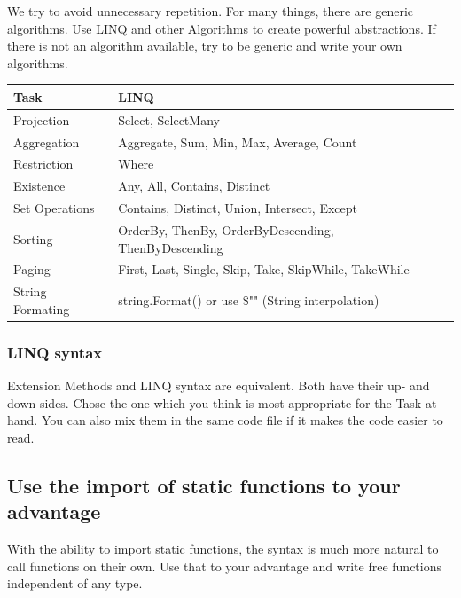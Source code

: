 \documentclass[11pt,a4paper]{article}
\begin{document}
We try to avoid unnecessary repetition. For many things, there are generic algorithms. Use LINQ and other Algorithms to create powerful abstractions.
If there is not an algorithm available, try to be generic and write your own algorithms.

\begin{table}
\centering
\begin{tabular}{lp{60mm}l}
\textbf{Task}        & \textbf{LINQ}                                         \\
\hline
Projection           & Select, SelectMany                                    \\
\hline
Aggregation          & Aggregate, Sum, Min, Max, Average, Count              \\
\hline
Restriction          & Where                                                 \\
\hline
Existence            & Any, All, Contains, Distinct                          \\
\hline
Set Operations       & Contains, Distinct, Union, Intersect, Except          \\
\hline
Sorting              & OrderBy, ThenBy, OrderByDescending, ThenByDescending  \\
\hline
Paging               & First, Last, Single, Skip, Take, SkipWhile, TakeWhile \\
\hline
String Formating     & string.Format() or use \$"" (String interpolation)
\end{tabular}
\end{table}

\subsubsection{LINQ syntax}

Extension Methods and LINQ syntax are equivalent. Both have their up- and down-sides. Chose the one which you think is most appropriate for the Task at hand. You can also mix them in the same code file if it makes the code easier to read.

\subsection{Use the import of static functions to your advantage}

With the ability to import static functions, the syntax is much more natural to call functions on their own. Use that to your advantage and write free functions independent of any type.
\end{document}
